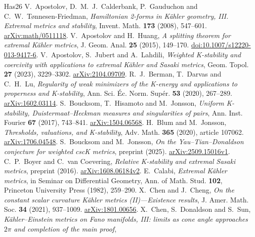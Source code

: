 \documentclass[12pt]{amsart}
\theoremstyle{definition}
\theoremstyle{remark}
\numberwithin{equation}{section}
\begin{document}
\begin{thebibliography}{Has26}
V.~Apostolov, D.~M.~J.~Calderbank, P.~Gauduchon and C.~W.~T{\o}nnesen-Friedman,
\emph{Hamiltonian 2-forms in Kähler geometry, III. Extremal metrics and stability},
Invent. Math. \textbf{173} (2008), 547--601.
\href{https://arxiv.org/abs/math/0511118}{arXiv:math/0511118}.
V.~Apostolov and H.~Huang,
\emph{A splitting theorem for extremal Kähler metrics},
J. Geom. Anal. \textbf{25} (2015), 149--170.
\href{https://doi.org/10.1007/s12220-013-9417-6}{doi:10.1007/s12220-013-9417-6}.
V.~Apostolov, S.~Jubert and A.~Lahdili,
\emph{Weighted K-stability and coercivity with applications to extremal Kähler and Sasaki metrics},
Geom. Topol. \textbf{27} (2023), 3229--3302.
\href{https://arxiv.org/abs/2104.09709}{arXiv:2104.09709}.
R.~J.~Berman, T.~Darvas and C.~H.~Lu,
\emph{Regularity of weak minimizers of the K-energy and applications to properness and K-stability},
Ann. Sci. Éc. Norm. Supér. \textbf{53} (2020), 267--289.
\href{https://arxiv.org/abs/1602.03114}{arXiv:1602.03114}.
S.~Boucksom, T.~Hisamoto and M.~Jonsson,
\emph{Uniform K-stability, Duistermaat--Heckman measures and singularities of pairs},
Ann. Inst. Fourier \textbf{67} (2017), 743--841.
\href{https://arxiv.org/abs/1504.06568}{arXiv:1504.06568}.
H.~Blum and M.~Jonsson,
\emph{Thresholds, valuations, and K-stability},
Adv. Math. \textbf{365} (2020), article 107062.
\href{https://arxiv.org/abs/1706.04548}{arXiv:1706.04548}.
S.~Boucksom and M.~Jonsson,
\emph{On the Yau--Tian--Donaldson conjecture for weighted cscK metrics},
preprint (2025).
\href{https://arxiv.org/abs/2509.15016v1}{arXiv:2509.15016v1}.
C.~P.~Boyer and C.~van Coevering,
\emph{Relative K-stability and extremal Sasaki metrics},
preprint (2016).
\href{https://arxiv.org/abs/1608.06184v2}{arXiv:1608.06184v2}.
E.~Calabi,
\emph{Extremal Kähler metrics},
in Seminar on Differential Geometry, Ann. of Math. Stud. \textbf{102},
Princeton University Press (1982), 259--290.
X.~Chen and J.~Cheng,
\emph{On the constant scalar curvature Kähler metrics (II)---Existence results},
J. Amer. Math. Soc. \textbf{34} (2021), 937--1009.
\href{https://arxiv.org/abs/1801.00656}{arXiv:1801.00656}.
X.~Chen, S.~Donaldson and S.~Sun,
\emph{Kähler--Einstein metrics on Fano manifolds, III: limits as cone angle approaches $2\pi$ and completion of the main proof},

\end{thebibliography}
\end{document}
